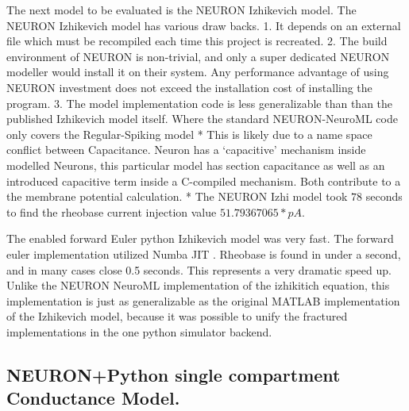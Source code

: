 The next model to be evaluated is the NEURON Izhikevich model. The NEURON Izhikevich model has various draw backs. 1. It depends on an external file which must be recompiled each time this project is recreated. 2. The build environment of NEURON is non-trivial, and only a super dedicated NEURON modeller would install it on their system. Any performance advantage of using NEURON investment does not exceed the installation cost of installing the program. 3. The model implementation code is less generalizable than than the published Izhikevich model itself. Where the standard NEURON-NeuroML code only covers the Regular-Spiking model * This is likely due to a name space conflict between Capacitance. Neuron has a `capacitive' mechanism inside modelled Neurons, this particular model has section capacitance as well as an introduced capacitive term inside a C-compiled mechanism. Both contribute to a the membrane
potential calculation. * The NEURON Izhi model took $78$ seconds to find the rheobase current injection value $ 51.79367065 * pA $.

    




        
The enabled forward Euler python Izhikevich model was very fast. The forward euler
implementation utilized Numba JIT \cite{lam2015numba}. Rheobase is found in under a second,
and in many cases close 0.5 seconds. This represents a very dramatic
speed up. Unlike the NEURON NeuroML implementation of the izhikitich equation,
this implementation is just as generalizable as the original MATLAB
implementation of the Izhikevich model, because it was possible to unify the fractured implementations in the one python simulator backend.

\subsection{NEURON+Python single compartment Conductance Model.}


